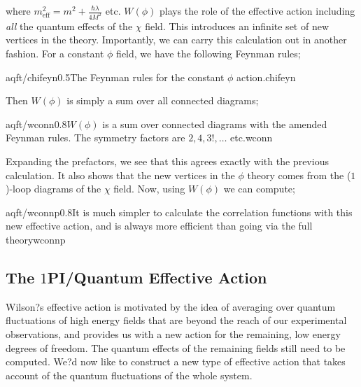 where $m^2_{\text{eff}} = m^2 + \tfrac{\hbar\lambda}{4M^2}$ etc. $W(\phi)$ plays the role of the effective action including \emph{all} the quantum effects of the $\chi$ field. This introduces an infinite set of new vertices in the theory. Importantly, we can carry this calculation out in another fashion. For a constant $\phi$ field, we have the following Feynman rules;
\begin{mygraphic}{aqft/chifeyn}{0.5}{The Feynman rules for the constant $\phi$ action.}{chifeyn}\end{mygraphic} 
Then $W(\phi)$ is simply a sum over all connected diagrams;
\begin{mygraphic}{aqft/wconn}{0.8}{$W(\phi)$ is a sum over connected diagrams with the amended Feynman rules. The symmetry factors are $2, 4, 3!, \ldots$ etc.}{wconn}\end{mygraphic}
Expanding the prefactors, we see that this agrees exactly with the previous calculation. It also shows that the new vertices in the $\phi$ theory comes from the ($1$)-loop diagrams of the $\chi$ field. Now, using $W(\phi)$ we can compute;
\begin{mygraphic}{aqft/wconnp}{0.8}{It is much simpler to calculate the correlation functions with this new effective action, and is always more efficient than going via the full theory}{wconnp}\end{mygraphic}
\subsection{The $1$PI/Quantum Effective Action}
Wilson?s effective action is motivated by the idea of averaging over quantum fluctuations of high energy fields that are beyond the reach of our experimental observations, and provides us with a new action for the remaining, low energy degrees of freedom. The quantum effects of the remaining fields still need to be computed. We?d now like to construct a new type of effective action that takes account of the quantum fluctuations of the whole system.

